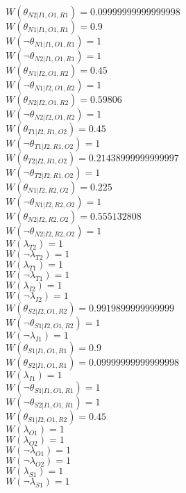 $W(\theta_{N2|I1,O1,R1})=0.09999999999999998$\\
$W(\theta_{N1|I1,O1,R1})=0.9$\\
$W(\neg\theta_{N1|I1,O1,R1})=1$\\
$W(\neg\theta_{N2|I1,O1,R1})=1$\\
$W(\theta_{N1|I2,O1,R2})=0.45$\\
$W(\neg\theta_{N1|I2,O1,R2})=1$\\
$W(\theta_{N2|I2,O1,R2})=0.59806$\\
$W(\neg\theta_{N2|I2,O1,R2})=1$\\
$W(\theta_{T1|I2,R1,O2})=0.45$\\
$W(\neg\theta_{T1|I2,R1,O2})=1$\\
$W(\theta_{T2|I2,R1,O2})=0.21438999999999997$\\
$W(\neg\theta_{T2|I2,R1,O2})=1$\\
$W(\theta_{N1|I2,R2,O2})=0.225$\\
$W(\neg\theta_{N1|I2,R2,O2})=1$\\
$W(\theta_{N2|I2,R2,O2})=0.555132808$\\
$W(\neg\theta_{N2|I2,R2,O2})=1$\\
$W(\lambda_{T2})=1$\\
$W(\neg\lambda_{T2})=1$\\
$W(\lambda_{T1})=1$\\
$W(\neg\lambda_{T1})=1$\\
$W(\lambda_{I2})=1$\\
$W(\neg\lambda_{I2})=1$\\
$W(\theta_{S2|I2,O1,R2})=0.9919899999999999$\\
$W(\neg\theta_{S1|I2,O1,R2})=1$\\
$W(\neg\lambda_{I1})=1$\\
$W(\theta_{S1|I1,O1,R1})=0.9$\\
$W(\theta_{S2|I1,O1,R1})=0.09999999999999998$\\
$W(\lambda_{I1})=1$\\
$W(\neg\theta_{S1|I1,O1,R1})=1$\\
$W(\neg\theta_{S2|I1,O1,R1})=1$\\
$W(\theta_{S1|I2,O1,R2})=0.45$\\
$W(\lambda_{O1})=1$\\
$W(\lambda_{O2})=1$\\
$W(\neg\lambda_{O1})=1$\\
$W(\neg\lambda_{O2})=1$\\
$W(\lambda_{S1})=1$\\
$W(\neg\lambda_{S1})=1$\\
